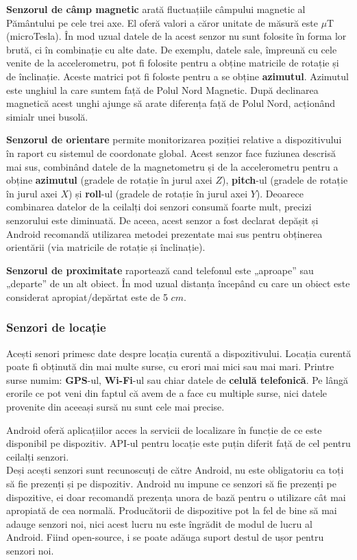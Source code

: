 \documentclass[12pt,a4paper]{article}
\begin{document}
\textbf{Senzorul de câmp magnetic} arată fluctuațiile câmpului magnetic al Pământului pe cele trei axe. El oferă valori a căror unitate de măsură este $\mu$T (microTesla). În mod uzual datele de la acest senzor nu sunt folosite în forma lor brută, ci în combinație cu alte date. De exemplu, datele sale, împreună cu cele venite de la accelerometru, pot fi folosite pentru a obține matricile de rotație și de înclinație. Aceste matrici pot fi foloste pentru a se obține \textbf{azimutul}. Azimutul este unghiul la care suntem față de Polul Nord Magnetic. După declinarea magnetică acest unghi ajunge să arate diferența față de Polul Nord, acționând simialr unei busolă.

\textbf{Senzorul de orientare} permite monitorizarea poziției relative a dispozitivului în raport cu sistemul de coordonate global. Acest senzor face fuziunea descrisă mai sus, combinând datele de la magnetometru și de la accelerometru pentru a obține \textbf{azimutul} (gradele de rotație în jurul axei $Z$), \textbf{pitch}-ul (gradele de rotație în jurul axei $X$) și \textbf{roll}-ul (gradele de rotație în jurul axei $Y$). Deoarece combinarea datelor de la ceilalți doi senzori consumă foarte mult, precizi senzorului este diminuată. De aceea, acest senzor a fost declarat depășit și Android recomandă utilizarea metodei prezentate mai sus pentru obținerea orientării (via matricile de rotație și înclinație).

\textbf{Senzorul de proximitate} raportează cand telefonul este „aproape” sau „departe” de un alt obiect. În mod uzual distanța începând cu care un obiect este considerat apropiat/depărtat este de 5 $cm$.

\subsubsection{Senzori de locație}
Acești senori primesc date despre locația curentă a dispozitivului. Locația curentă poate fi obținută din mai multe surse, cu erori mai mici sau mai mari. Printre surse numim: \textbf{GPS}-ul, \textbf{Wi-Fi}-ul sau chiar datele de \textbf{celulă telefonică}. Pe lângă erorile ce pot veni din faptul că avem de a face cu multiple surse, nici datele provenite din aceeași sursă nu sunt cele mai precise.

Android oferă aplicațiilor acces la servicii de localizare în funcție de ce este disponibil pe dispozitiv. API-ul pentru locație este puțin diferit față de cel pentru ceilalți senzori.\\

Deși acești senzori sunt recunoscuți de către Android, nu este obligatoriu ca toți să fie prezenți și pe dispozitiv. Android nu impune ce senzori să fie prezenți pe dispozitive, ei doar recomandă prezența unora de bază pentru o utilizare cât mai apropiată de cea normală. Producătorii de dispozitive pot la fel de bine să mai adauge senzori noi, nici acest lucru nu este îngrădit de modul de lucru al Android. Fiind open-source, i se poate adăuga suport destul de ușor pentru senzori noi.
\end{document}
